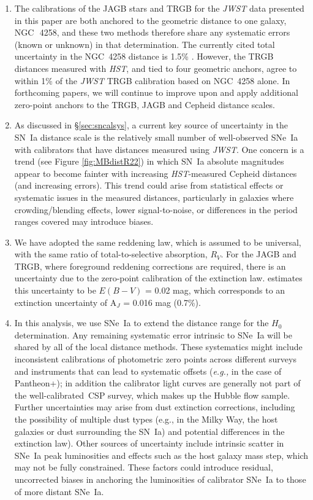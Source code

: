\documentclass[12pt,modern]{aastex631}
\newcommand{\csp}{\,CSP\xspace}
\newcommand{\ho}{$H_{0}$\xspace}
\newcommand{\hst}{\emph{HST}\xspace}
\newcommand{\jwst}{\emph{JWST}\xspace}
\newcommand{\sne}{SNe~Ia\xspace}
\newcommand{\sn}{SN~Ia\xspace}
\newcommand{\ngc}{NGC\,\xspace}
\begin{document}
\begin{enumerate}



\item The calibrations of the JAGB stars and TRGB   for the \jwst data presented in this paper are both  anchored to the geometric distance to one galaxy, \ngc~4258, and  these two methods therefore share any systematic errors (known or unknown) in that determination. The currently cited total uncertainty in the \ngc 4258 distance is 1.5\% \citep{reid_2019}. However, the TRGB distances measured with \hst \citep{freedman_2021}, and tied to four geometric anchors, agree to within 1\% of the \jwst TRGB calibration based on \ngc 4258 alone.  
In forthcoming papers, we will continue to improve upon and apply additional  zero-point anchors to the TRGB, JAGB and Cepheid distance scales.



\item As discussed in \S \ref{sec:sncalsys}, a current key source of uncertainty in the \sn distance scale is the relatively small number of well-observed \sne with calibrators that have distances measured using \jwst. One concern is a trend (see Figure \ref{fig:MBdistR22}) in which \sn absolute magnitudes appear to become fainter with increasing \hst-measured Cepheid distances (and increasing errors). This trend could arise from statistical effects or systematic issues in the measured distances, particularly in galaxies where crowding/blending effects, lower signal-to-noise, or differences in the period ranges covered may introduce biases.


\item We have adopted the same reddening law, which is assumed to be universal, with the same ratio of total-to-selective absorption, $R_V$. For the JAGB and TRGB, where foreground reddening corrections are required, there is an uncertainty due to the zero-point calibration of the extinction law. \citet{schlegel_1998} estimates this uncertainty to be $E(B-V)$ = 0.02 mag, which corresponds to an extinction uncertainty of A$_J$ = 0.016 mag (0.7\%).

\item In this analysis, we use \sne to extend the distance range for the \ho determination. Any remaining systematic error intrinsic to \sne will be shared by all of the local distance methods. These systematics might include inconsistent calibrations 
of photometric zero points across different surveys and instruments that can lead to systematic offsets ({\it e.g.,} in the case of Pantheon+); in addition the calibrator light curves are generally not part of the well-calibrated \csp survey, which makes up the Hubble flow sample. Further uncertainties may arise from dust extinction corrections, including the possibility of multiple dust types (e.g., in the Milky Way, the host galaxies or dust surrounding the \sn) and potential differences in the extinction law). Other sources of uncertainty include intrinsic scatter in \sne peak luminosities and effects such as the host galaxy mass step, which may not be fully constrained. These factors could introduce residual, uncorrected biases in anchoring the luminosities of calibrator \sne to those of more distant \sne. 


\end{enumerate}
\end{document}
